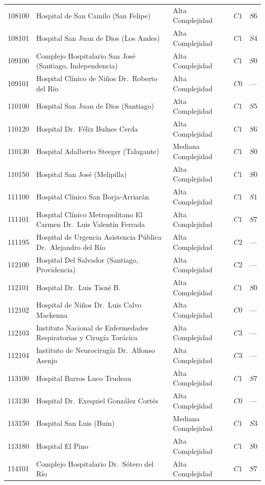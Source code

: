 \begin{longtable}{p{1.3cm} p{6.8cm} p{2.4cm} p{1.0cm} p{1.0cm}}
108100 & Hospital de San Camilo (San Felipe) & Alta Complejidad & $C1$ & $S6$ \\
108101 & Hospital San Juan de Dios (Los Andes) & Alta Complejidad & $C1$ & $S4$ \\
109100 & Complejo Hospitalario San José (Santiago, Independencia) & Alta Complejidad & $C1$ & $S0$ \\
109101 & Hospital Clínico de Niños Dr.\ Roberto del Río & Alta Complejidad & $C0$ & --- \\
110100 & Hospital San Juan de Dios (Santiago) & Alta Complejidad & $C1$ & $S5$ \\
110120 & Hospital Dr.\ Félix Bulnes Cerda & Alta Complejidad & $C1$ & $S6$ \\
110130 & Hospital Adalberto Steeger (Talagante) & Mediana Complejidad & $C1$ & $S0$ \\
110150 & Hospital San José (Melipilla) & Alta Complejidad & $C1$ & $S0$ \\
111100 & Hospital Clínico San Borja-Arriarán & Alta Complejidad & $C1$ & $S1$ \\
111101 & Hospital Clínico Metropolitano El Carmen Dr.\ Luis Valentín Ferrada & Alta Complejidad & $C1$ & $S7$ \\
111195 & Hospital de Urgencia Asistencia Pública Dr.\ Alejandro del Río & Alta Complejidad & $C2$ & --- \\
112100 & Hospital Del Salvador (Santiago, Providencia) & Alta Complejidad & $C2$ & --- \\
112101 & Hospital Dr.\ Luis Tisné B. & Alta Complejidad & $C1$ & $S0$ \\
112102 & Hospital de Niños Dr.\ Luis Calvo Mackenna & Alta Complejidad & $C0$ & --- \\
112103 & Instituto Nacional de Enfermedades Respiratorias y Cirugía Torácica & Alta Complejidad & $C3$ & --- \\
112104 & Instituto de Neurocirugía Dr.\ Alfonso Asenjo & Alta Complejidad & $C3$ & --- \\
113100 & Hospital Barros Luco Trudeau & Alta Complejidad & $C1$ & $S7$ \\
113130 & Hospital Dr.\ Exequiel González Cortés & Alta Complejidad & $C0$ & --- \\
113150 & Hospital San Luis (Buin) & Mediana Complejidad & $C1$ & $S3$ \\
113180 & Hospital El Pino & Alta Complejidad & $C1$ & $S0$ \\
114101 & Complejo Hospitalario Dr.\ Sótero del Río & Alta Complejidad & $C1$ & $S7$ \\

\end{longtable}
